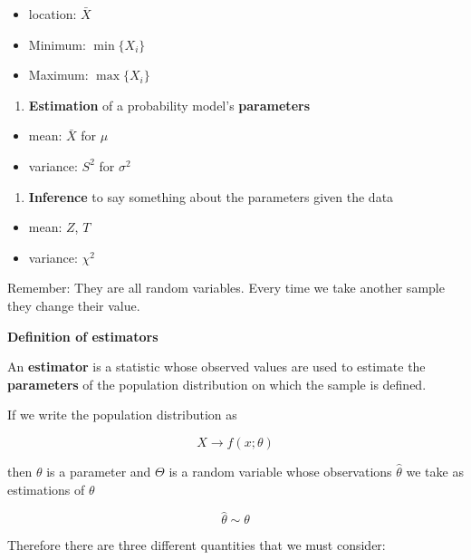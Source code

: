 \documentclass[
]{book}
\providecommand{\tightlist}{%
  \setlength{\itemsep}{0pt}\setlength{\parskip}{0pt}}
\begin{document}
\begin{itemize}
\tightlist
\item
  location: \(\bar{X}\)
\item
  Minimum: \(\min\{X_i\}\)
\item
  Maximum: \(\max\{X_i\}\)
\end{itemize}

\begin{enumerate}
\def\labelenumi{\arabic{enumi}.}
\setcounter{enumi}{1}
\tightlist
\item
  \textbf{Estimation} of a probability model's \textbf{parameters}
\end{enumerate}

\begin{itemize}
\tightlist
\item
  mean: \(\bar{X}\) for \(\mu\)
\item
  variance: \(S^2\) for \(\sigma^2\)
\end{itemize}

\begin{enumerate}
\def\labelenumi{\arabic{enumi}.}
\setcounter{enumi}{2}
\tightlist
\item
  \textbf{Inference} to say something about the parameters given the data
\end{enumerate}

\begin{itemize}
\tightlist
\item
  mean: \(Z\), \(T\)
\item
  variance: \(\chi^2\)
\end{itemize}

Remember: They are all random variables. Every time we take another sample they change their value.

\textbf{Definition of estimators}

An \textbf{estimator} is a statistic whose observed values are used to estimate the \textbf{parameters} of the population distribution on which the sample is defined.

If we write the population distribution as

\[X \rightarrow f(x; \theta)\]

then \(\theta\) is a parameter and \(\Theta\) is a random variable whose observations \(\hat{\theta}\) we take as estimations of \(\theta\)

\[\hat{\theta} \sim \theta\]

Therefore there are three different quantities that we must consider:
\end{document}
